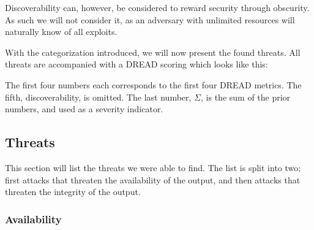 Discoverability can, however, be considered to reward security through obscurity. As such we will not consider it, as an adversary with unlimited resources will naturally know of all exploits.

With the categorization introduced, we will now present the found threats.
All threats are accompanied with a DREAD scoring which looks like this:

\begin{center}
\end{center}

The first four numbers each corresponds to the first four DREAD metrics. The fifth, discoverability, is omitted. The last number, $\Sigma$, is the sum of the prior numbers, and used as a severity indicator.

\subsection{Threats}
This section will list the threats we were able to find. The list is split into two; first attacks that threaten the availability of the output, and then attacks that threaten the integrity of the output.

\subsubsection{Availability}

\newcommand{\parathreat}[1]{\paragraph{#1}\hspace{-1ex}}

